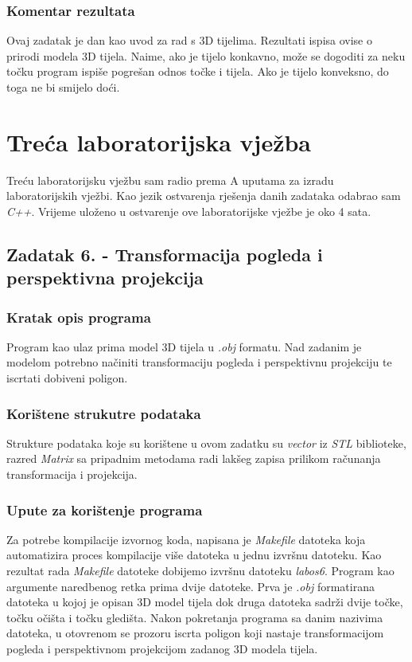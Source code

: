 \documentclass[oneside]{scrbook}
\begin{document}
\subsection{Komentar rezultata}
Ovaj zadatak je dan kao uvod za rad s 3D tijelima. Rezultati ispisa ovise o prirodi modela 3D tijela. Naime, ako je tijelo konkavno, može se dogoditi za neku točku program ispiše pogrešan odnos točke i tijela. Ako je tijelo konveksno, do toga ne bi smijelo doći.

\chapter{Treća laboratorijska vježba}
Treću laboratorijsku vježbu sam radio prema A uputama za izradu laboratorijskih vježbi. Kao jezik ostvarenja rješenja danih zadataka odabrao sam \textit{C++}. Vrijeme uloženo u ostvarenje ove laboratorijske vježbe je oko 4 sata. 

\section{Zadatak 6. - Transformacija pogleda i perspektivna projekcija}
\subsection{Kratak opis programa}
Program kao ulaz prima model 3D tijela u \textit{.obj} formatu. Nad zadanim je modelom potrebno načiniti transformaciju pogleda i perspektivnu projekciju te iscrtati dobiveni poligon.

\subsection{Korištene strukutre podataka}
Strukture podataka koje su korištene u ovom zadatku su \textit{vector} iz \textit{STL} biblioteke, razred \textit{Matrix} sa pripadnim metodama radi lakšeg zapisa prilikom računanja transformacija i projekcija.

\subsection{Upute za korištenje programa}
Za potrebe kompilacije izvornog koda, napisana je \textit{Makefile} datoteka koja automatizira proces kompilacije više datoteka u jednu izvršnu datoteku. Kao rezultat rada \textit{Makefile} datoteke dobijemo izvršnu datoteku \textit{labos6}. Program kao argumente naredbenog retka prima dvije datoteke. Prva je \textit{.obj} formatirana datoteka u kojoj je opisan 3D model tijela dok druga datoteka sadrži dvije točke, točku očišta i točku gledišta. Nakon pokretanja programa sa danim nazivima datoteka, u otovrenom se prozoru iscrta poligon koji nastaje transformacijom pogleda i perspektivnom projekcijom zadanog 3D modela tijela.
\end{document}
